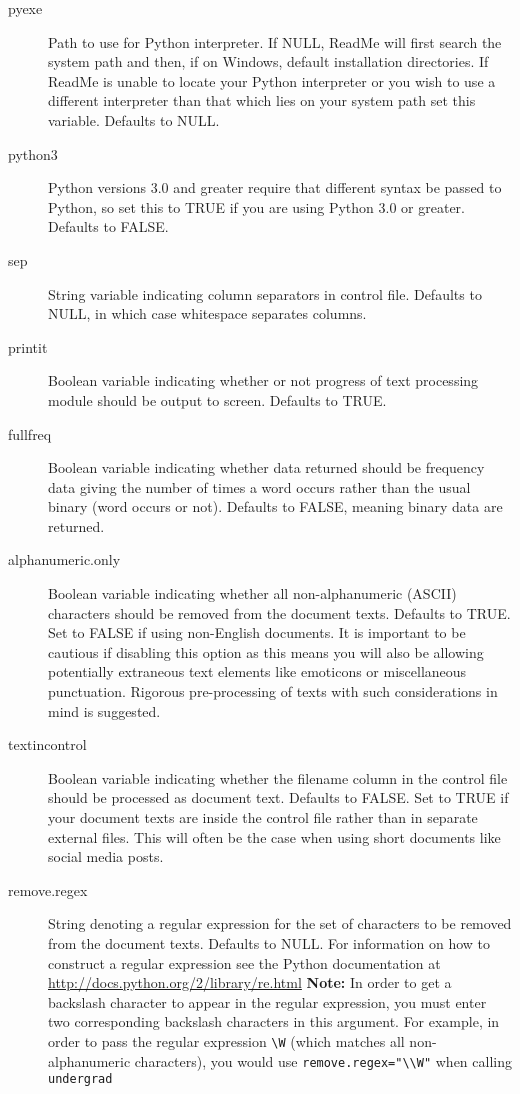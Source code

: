\documentclass[oneside,letterpaper,titlepage]{article}
\begin{document}
\begin{description}
\item[pyexe] Path to use for Python interpreter. If NULL, ReadMe will
  first search the system path and then, if on Windows, default
  installation directories. If ReadMe is unable to locate your Python
  interpreter or you wish to use a different interpreter than that
  which lies on your system path set this variable. Defaults to NULL.

\item[python3] Python versions 3.0 and greater require that different
syntax be passed to Python, so set this to TRUE if you are using
Python 3.0 or greater.  Defaults to FALSE.  
  
\item[sep] String variable indicating column separators in control
  file.  Defaults to NULL, in which case whitespace separates columns.

\item[printit] Boolean variable indicating whether or not progress of
  text processing module should be output to screen. Defaults to TRUE.
\item[fullfreq] Boolean variable indicating whether data returned should
be frequency data giving the number of times a word occurs rather than the usual binary (word occurs or not). Defaults to FALSE, meaning binary data are returned.

\item[alphanumeric.only] Boolean variable indicating whether all non-alphanumeric (ASCII) characters should be removed from the document texts. Defaults to TRUE. Set to FALSE if using non-English documents. It is important to be cautious if disabling this option as this means you will also be allowing potentially extraneous text elements like emoticons or miscellaneous punctuation. Rigorous pre-processing of texts with such considerations in mind is suggested.

\item[textincontrol] Boolean variable indicating whether the filename column in the control file should be processed as document text. Defaults to FALSE. Set to TRUE if your document texts are inside the control file rather than in separate external files. This will often be the case when using short documents like social media posts.

\item[remove.regex] String denoting a regular expression for the set of characters to be removed from the document texts. Defaults to NULL. For information on how to construct a regular expression see the Python documentation at \url{http://docs.python.org/2/library/re.html}  \textbf{Note:} In order to get a backslash character to appear in the regular expression, you must enter two corresponding backslash characters in this argument. For example, in order to pass the regular expression \texttt{\textbackslash W} (which matches all non-alphanumeric characters), you would use \texttt{remove.regex="\textbackslash\textbackslash W"} when calling \texttt{undergrad}
\end{description}
\end{document}

